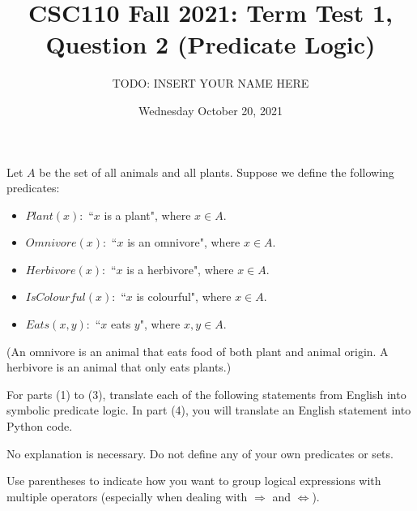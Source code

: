 \documentclass{article}
\title{CSC110 Fall 2021: Term Test 1, Question 2 (Predicate Logic)}
\author{TODO: INSERT YOUR NAME HERE}
\date{Wednesday October 20, 2021}
\begin{document}
\maketitle

Let $A$ be the set of all animals and all plants.
Suppose we define the following predicates:

\begin{itemize}
    \item $Plant(x):$ ``$x$ is a plant", where $x \in A$.
    \item $Omnivore(x):$ ``$x$ is an omnivore", where $x \in A$.
    \item $Herbivore(x):$ ``$x$ is a herbivore", where $x \in A$.
    \item $IsColourful(x):$ ``$x$ is colourful", where $x \in A$.
    \item $Eats(x, y):$ ``$x$ eats $y$", where $x, y \in A$.
\end{itemize}
(An omnivore is an animal that eats food of both plant and animal origin.
A herbivore is an animal that only eats plants.)

For parts (1) to (3), translate each of the following statements from English into symbolic predicate logic.
In part (4), you will translate an English statement into Python code.

No explanation is necessary.
Do not define any of your own predicates or sets.

Use parentheses to indicate how you want to group logical expressions with multiple operators (especially when dealing with $\Rightarrow$ and $\Leftrightarrow$).
\end{document}
